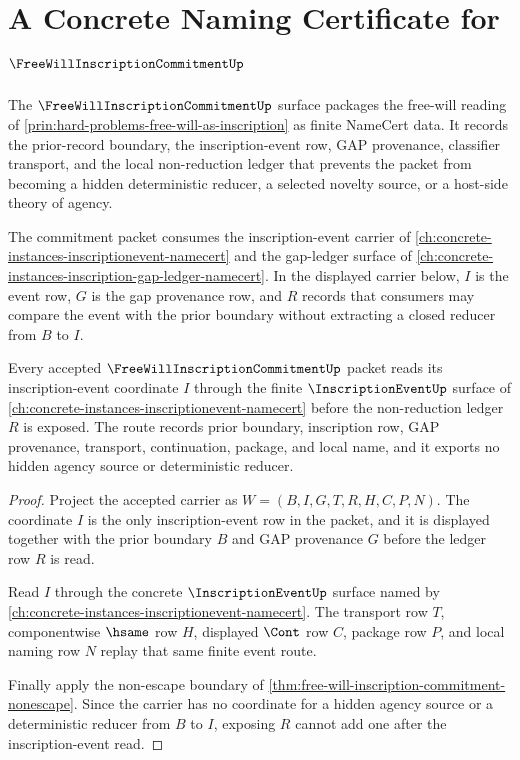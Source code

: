 \chapter{A Concrete Naming Certificate for $\FreeWillInscriptionCommitmentUp$}
\label{ch:concrete-instances-freewillinscriptioncommitment-namecert}

The $\FreeWillInscriptionCommitmentUp$ surface packages the free-will reading of \autoref{prin:hard-problems-free-will-as-inscription} as finite NameCert data. It records the prior-record boundary, the inscription-event row, GAP provenance, classifier transport, and the local non-reduction ledger that prevents the packet from becoming a hidden deterministic reducer, a selected novelty source, or a host-side theory of agency.

The commitment packet consumes the inscription-event carrier of \autoref{ch:concrete-instances-inscriptionevent-namecert} and the gap-ledger surface of \autoref{ch:concrete-instances-inscription-gap-ledger-namecert}. In the displayed carrier below, $I$ is the event row, $G$ is the gap provenance row, and $R$ records that consumers may compare the event with the prior boundary without extracting a closed reducer from $B$ to $I$.

\begin{theorem}
\label{thm:free-will-inscription-commitment-inscription-event-route}
Every accepted $\FreeWillInscriptionCommitmentUp$ packet reads its inscription-event coordinate $I$ through the finite $\InscriptionEventUp$ surface of \autoref{ch:concrete-instances-inscriptionevent-namecert} before the non-reduction ledger $R$ is exposed. The route records prior boundary, inscription row, GAP provenance, transport, continuation, package, and local name, and it exports no hidden agency source or deterministic reducer.
\end{theorem}
\begin{proof}
Project the accepted carrier as $W=(B,I,G,T,R,H,C,P,N)$. The coordinate $I$ is the only inscription-event row in the packet, and it is displayed together with the prior boundary $B$ and GAP provenance $G$ before the ledger row $R$ is read.

Read $I$ through the concrete $\InscriptionEventUp$ surface named by \autoref{ch:concrete-instances-inscriptionevent-namecert}. The transport row $T$, componentwise $\hsame$ row $H$, displayed $\Cont$ row $C$, package row $P$, and local naming row $N$ replay that same finite event route.

Finally apply the non-escape boundary of \autoref{thm:free-will-inscription-commitment-nonescape}. Since the carrier has no coordinate for a hidden agency source or a deterministic reducer from $B$ to $I$, exposing $R$ cannot add one after the inscription-event read.
\end{proof}

